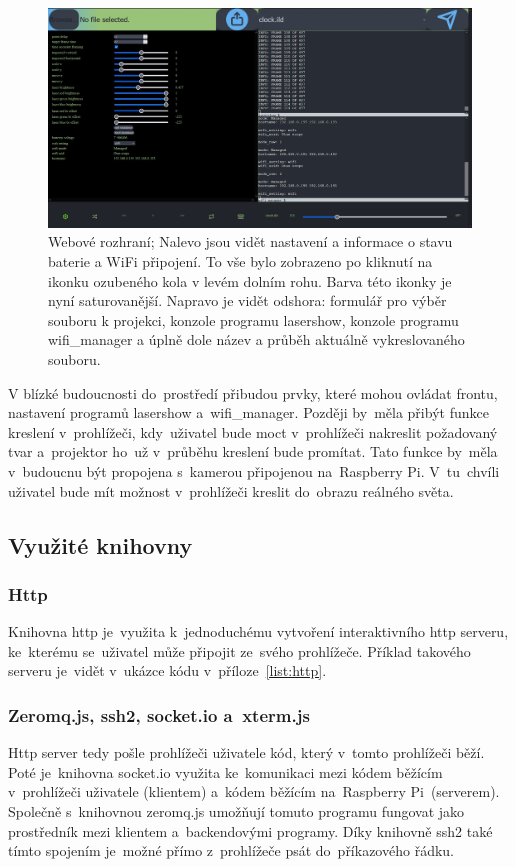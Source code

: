 \begin{figure}[ht]
    \centering
    \includegraphics[width=1\textwidth]{img/ui_web_settings.jpg}
    \caption{\label{fig:uiwebsettings} Webové rozhraní; Nalevo jsou vidět nastavení a informace o stavu baterie a WiFi připojení. To vše bylo zobrazeno po kliknutí na ikonku ozubeného kola v levém dolním rohu. Barva této ikonky je nyní saturovanější. Napravo je vidět odshora: formulář pro výběr souboru k projekci, konzole programu lasershow, konzole programu wifi\_manager a úplně dole název a průběh aktuálně vykreslovaného souboru.}
\end{figure}

V blízké budoucnosti do~prostředí přibudou prvky, které mohou ovládat frontu, nastavení programů lasershow a~wifi\_manager. Později by~měla přibýt funkce kreslení v~prohlížeči, kdy~uživatel bude moct v~prohlížeči nakreslit požadovaný tvar a~projektor ho~už v~průběhu kreslení bude promítat. Tato funkce by~měla v~budoucnu být propojena s~kamerou připojenou na~Raspberry Pi. V~tu~chvíli uživatel bude mít možnost v~prohlížeči kreslit do~obrazu reálného světa.

\subsection{Využité knihovny}
\subsubsection{Http}
Knihovna http je~využita k~jednoduchému vytvoření interaktivního http serveru, ke~kterému se~uživatel může připojit ze~svého prohlížeče. Příklad takového serveru je~vidět v~ukázce kódu v~příloze~\ref{list:http}.
    
\subsubsection{Zeromq.js, ssh2, socket.io a~xterm.js}
Http server tedy pošle prohlížeči uživatele kód, který v~tomto prohlížeči běží. Poté je~knihovna socket.io využita ke~komunikaci mezi kódem běžícím v~prohlížeči uživatele (klientem) a~kódem běžícím na~Raspberry Pi~(serverem).
Společně s~knihovnou zeromq.js umožňují tomuto programu fungovat jako prostředník mezi klientem a~backendovými programy. Díky knihovně ssh2 také tímto spojením je~možné přímo z~prohlížeče psát do~příkazového řádku.

